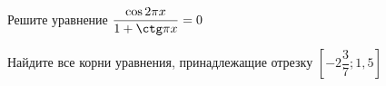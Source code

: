 \begin{ex}
	\begin{condition}
		\begin{enumcols}[label=\asbuk*)]
			\item Решите уравнение \( \dfrac{\cos 2\pi x}{1 + \ctg \pi x} = 0 \)
			\item Найдите все корни уравнения, принадлежащие отрезку \( \left[-2\dfrac{3}{7};1,5\right] \)
		\end{enumcols}
	\end{condition}
\end{ex}